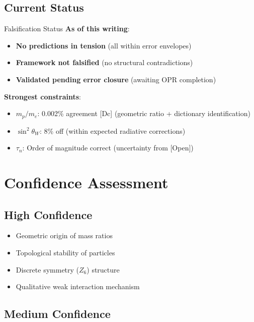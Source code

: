 \subsection{Current Status}

\begin{statusbox}{Falsification Status}
\textbf{As of this writing}:
\begin{itemize}[nosep]
\item \textbf{No predictions in tension} (all within error envelopes)
\item \textbf{Framework not falsified} (no structural contradictions)
\item \textbf{Validated pending error closure} (awaiting OPR completion)
\end{itemize}

\textbf{Strongest constraints}:
\begin{itemize}[nosep]
\item $m_p/m_e$: 0.002\% agreement [Dc] (geometric ratio + dictionary identification)
\item $\sin^2\theta_W$: 8\% off (within expected radiative corrections)
\item $\tau_n$: Order of magnitude correct (uncertainty from [Open])
\end{itemize}
\end{statusbox}

\section{Confidence Assessment}
\label{sec:confidence}

\subsection{High Confidence}

\begin{itemize}[nosep]
\item Geometric origin of mass ratios
\item Topological stability of particles
\item Discrete symmetry ($Z_6$) structure
\item Qualitative weak interaction mechanism
\end{itemize}

\subsection{Medium Confidence}

